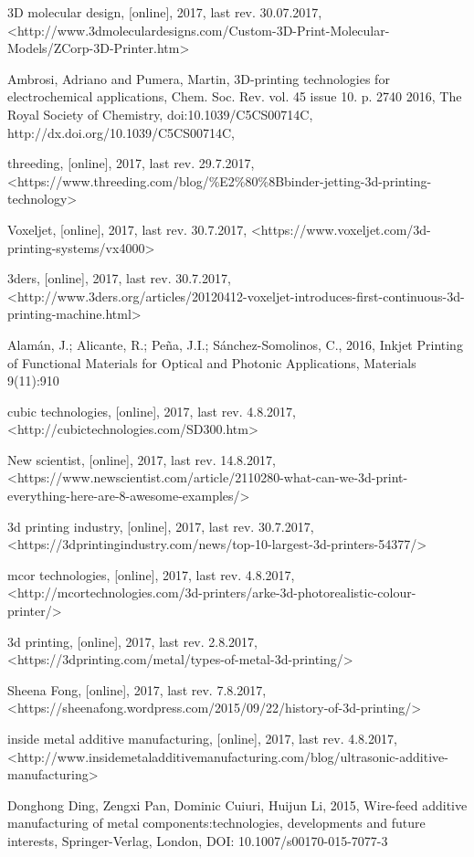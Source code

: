 \documentclass[a4paper, 11pt, reqno]{report}
\begin{document}
\begin{thebibliography}{99}
	3D molecular design,
	[online],
	2017,
	last rev. 30.07.2017,
	<http://www.3dmoleculardesigns.com/Custom-3D-Print-Molecular-Models/ZCorp-3D-Printer.htm>

	Ambrosi, Adriano and Pumera, Martin,
	3D-printing technologies for electrochemical applications,
	Chem. Soc. Rev. vol. 45 issue 10. p. 2740
	2016,
	The Royal Society of Chemistry,
	doi:10.1039/C5CS00714C,
	http://dx.doi.org/10.1039/C5CS00714C,

	threeding,
	[online],
	2017,
	last rev. 29.7.2017,\\
	<https://www.threeding.com/blog/\%E2\%80\%8Bbinder-jetting-3d-printing-technology>
	
	Voxeljet,
	[online],
	2017,
	last rev. 30.7.2017,
	<https://www.voxeljet.com/3d-printing-systems/vx4000>
	
	3ders,
	[online],
	2017,
	last rev. 30.7.2017,
	<http://www.3ders.org/articles/20120412-voxeljet-introduces-first-continuous-3d-printing-machine.html>

	Alamán, J.; Alicante, R.; Peña, J.I.; Sánchez-Somolinos, C.,
	2016,
	Inkjet Printing of Functional Materials for Optical and Photonic Applications,
	Materials 9(11):910

	cubic technologies,
	[online],
	2017,
	last rev. 4.8.2017,
	<http://cubictechnologies.com/SD300.htm>
	
	New scientist,
	[online],
	2017,
	last rev. 14.8.2017,
	<https://www.newscientist.com/article/2110280-what-can-we-3d-print-everything-here-are-8-awesome-examples/>
	
	3d printing industry,
	[online],
	2017,
	last rev. 30.7.2017,
	<https://3dprintingindustry.com/news/top-10-largest-3d-printers-54377/>

	mcor technologies,
	[online],
	2017,
	last rev. 4.8.2017,
	<http://mcortechnologies.com/3d-printers/arke-3d-photorealistic-colour-printer/>

	3d printing,
	[online],
	2017,
	last rev. 2.8.2017,
	<https://3dprinting.com/metal/types-of-metal-3d-printing/>

	Sheena Fong,
	[online],
	2017,
	last rev. 7.8.2017,\\
	<https://sheenafong.wordpress.com/2015/09/22/history-of-3d-printing/>

	inside metal additive manufacturing,
	[online],
	2017,
	last rev. 4.8.2017,
	<http://www.insidemetaladditivemanufacturing.com/blog/ultrasonic-additive-manufacturing>

	Donghong Ding, Zengxi Pan, Dominic Cuiuri, Huijun Li,
	2015,
	Wire-feed additive manufacturing of metal components:technologies, developments and future interests,
	Springer-Verlag,
	London,
	DOI: 10.1007/s00170-015-7077-3

	
\end{thebibliography}
\end{document}
